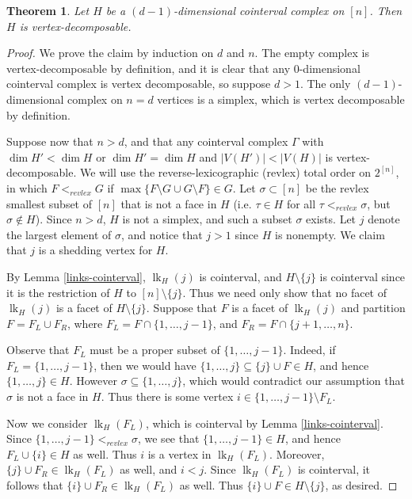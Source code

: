 \documentclass[11pt]{amsart}
\newtheorem{theorem}{Theorem}[section]
\theoremstyle{definition}
\numberwithin{equation}{section}
\theoremstyle{remark}
\numberwithin{equation}{section}
\begin{document}
\begin{theorem}\label{decomposable}
Let $H$ be a $(d-1)$-dimensional cointerval complex on $[n]$.  Then $H$ is vertex-decomposable. 
\end{theorem}

\begin{proof}
We prove the claim by induction on $d$ and $n$.  
The empty complex is vertex-decomposable by definition, and it is clear that any $0$-dimensional cointerval complex is vertex decomposable, so suppose $d >1$.  
The only $(d-1)$-dimensional complex on $n=d$ vertices is a simplex, which is vertex decomposable by definition.  

Suppose now that $n > d$, and that any cointerval complex $\Gamma$ with $\dim H' < \dim H$ or $\dim H' = \dim H$ and $|V(H')| < |V(H)|$ is vertex-decomposable.  
We will use the reverse-lexicographic (revlex) total order on $2^{[n]}$, in which $F<_{revlex}G$ if $\max\{F\setminus G \cup G \setminus F\} \in G$. 
Let $\sigma \subset [n]$ be the revlex smallest subset of $[n]$ that is not a face in $H$ (i.e. $\tau \in H$ for all $\tau <_{revlex} \sigma$, but $\sigma \notin H$).  
Since $n>d$, $H$ is not a simplex, and such a subset $\sigma$ exists.  
Let $j$ denote the largest element of $\sigma$, and notice that $j>1$ since $H$ is nonempty. 
We claim that $j$ is a shedding vertex for $H$.  

By Lemma \ref{links-cointerval}, $\operatorname{lk}_{H}(j)$ is cointerval, and $H \setminus\{j\}$ is cointerval since it is the restriction of $H$ to $[n]\setminus \{j\}$.  
Thus we need only show that no facet of $\operatorname{lk}_{H}(j)$ is a facet of $H \setminus \{j\}$.  
Suppose that $F$ is a facet of $\operatorname{lk}_{H}(j)$ and partition $F = F_L \cup F_R$, where $F_L = F \cap \{1, \ldots, j-1\}$, and $F_R = F \cap \{j+1, \ldots, n\}$.  

Observe that $F_L$ must be a proper subset of $\{1,\ldots,j-1\}$.  Indeed, if $F_L = \{1,\ldots,j-1\}$, then we would have $\{1,\ldots,j\} \subseteq \{j\} \cup F \in H$, and hence $\{1,\ldots,j\} \in  H$.  However $\sigma \subseteq \{1,\ldots,j\}$, which would contradict our assumption that $\sigma$ is not a face in $H$.  Thus there is some vertex $i \in \{1,\ldots,j-1\} \setminus F_L$.  

Now we consider $\operatorname{lk}_{H}(F_L)$, which is cointerval by Lemma \ref{links-cointerval}.  Since $\{1,\ldots,j-1\} <_{revlex} \sigma$, we see that $\{1,\ldots,j-1\} \in H$, and hence $F_L \cup \{i\} \in H$ as well.  Thus $i$ is a vertex in $\operatorname{lk}_{H}(F_L)$.  Moreover, $\{j\} \cup F_R \in \operatorname{lk}_{H}(F_L)$ as well, and $i < j$.  Since $\operatorname{lk}_{H}(F_L)$ is cointerval, it follows that $\{i\} \cup F_R \in \operatorname{lk}_{H}(F_L)$ as well.  Thus $\{i\} \cup F \in H \setminus\{j\}$, as desired. 

\end{proof}
\end{document}
